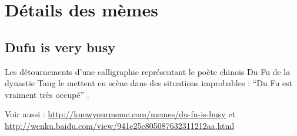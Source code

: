 \section{Détails des mèmes}
\label{sec:fullmemes}
\subsection{Dufu is very busy}

Les détournements d'une calligraphie représentant le poète chinois Du Fu de la dynastie Tang le mettent en scène dans des situations improbables : ``Du Fu est vraiment très occupé'' . 

Voir aussi :
\url{http://knowyourmeme.com/memes/du-fu-is-busy}
et
\url{http://wenku.baidu.com/view/941e25c805087632311212aa.html}

\begin{figure}[ht]
    \centering

\end{figure}
